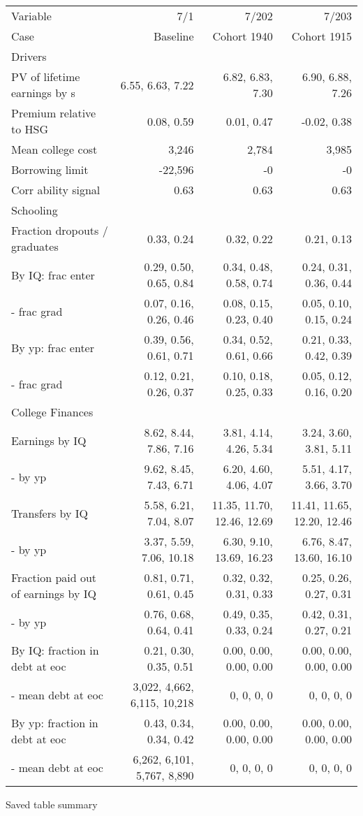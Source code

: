 \begin{tabular}{lrrr}
\hline
Variable & 7/1  & 7/202  & 7/203  \\ 
Case & Baseline  & Cohort 1940  & Cohort 1915  \\ 
Drivers &   &   &   \\ 
PV of lifetime earnings by s & 6.55, 6.63, 7.22  & 6.82, 6.83, 7.30  & 6.90, 6.88, 7.26  \\ 
Premium relative to HSG & 0.08, 0.59  & 0.01, 0.47  & -0.02, 0.38  \\ 
Mean college cost & 3,246  & 2,784  & 3,985  \\ 
Borrowing limit & -22,596  & -0  & -0  \\ 
Corr ability signal & 0.63  & 0.63  & 0.63  \\ 
\hline
Schooling &   &   &   \\ 
Fraction dropouts / graduates & 0.33, 0.24  & 0.32, 0.22  & 0.21, 0.13  \\ 
By IQ: frac enter & 0.29, 0.50, 0.65, 0.84  & 0.34, 0.48, 0.58, 0.74  & 0.24, 0.31, 0.36, 0.44  \\ 
- frac grad & 0.07, 0.16, 0.26, 0.46  & 0.08, 0.15, 0.23, 0.40  & 0.05, 0.10, 0.15, 0.24  \\ 
By yp: frac enter & 0.39, 0.56, 0.61, 0.71  & 0.34, 0.52, 0.61, 0.66  & 0.21, 0.33, 0.42, 0.39  \\ 
- frac grad & 0.12, 0.21, 0.26, 0.37  & 0.10, 0.18, 0.25, 0.33  & 0.05, 0.12, 0.16, 0.20  \\ 
\hline
College Finances &   &   &   \\ 
Earnings by IQ & 8.62, 8.44, 7.86, 7.16  & 3.81, 4.14, 4.26, 5.34  & 3.24, 3.60, 3.81, 5.11  \\ 
- by yp & 9.62, 8.45, 7.43, 6.71  & 6.20, 4.60, 4.06, 4.07  & 5.51, 4.17, 3.66, 3.70  \\ 
Transfers by IQ & 5.58, 6.21, 7.04, 8.07  & 11.35, 11.70, 12.46, 12.69  & 11.41, 11.65, 12.20, 12.46  \\ 
- by yp & 3.37, 5.59, 7.06, 10.18  & 6.30, 9.10, 13.69, 16.23  & 6.76, 8.47, 13.60, 16.10  \\ 
Fraction paid out of earnings by IQ & 0.81, 0.71, 0.61, 0.45  & 0.32, 0.32, 0.31, 0.33  & 0.25, 0.26, 0.27, 0.31  \\ 
- by yp & 0.76, 0.68, 0.64, 0.41  & 0.49, 0.35, 0.33, 0.24  & 0.42, 0.31, 0.27, 0.21  \\ 
By IQ: fraction in debt at eoc & 0.21, 0.30, 0.35, 0.51  & 0.00, 0.00, 0.00, 0.00  & 0.00, 0.00, 0.00, 0.00  \\ 
- mean debt at eoc & 3,022, 4,662, 6,115, 10,218  & 0, 0, 0, 0  & 0, 0, 0, 0  \\ 
By yp: fraction in debt at eoc & 0.43, 0.34, 0.34, 0.42  & 0.00, 0.00, 0.00, 0.00  & 0.00, 0.00, 0.00, 0.00  \\ 
- mean debt at eoc & 6,262, 6,101, 5,767, 8,890  & 0, 0, 0, 0  & 0, 0, 0, 0  \\ 
\hline
\end{tabular}%
Saved table summary

